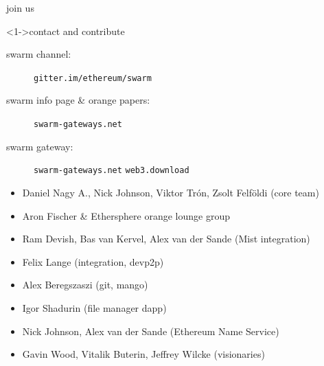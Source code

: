 \documentclass{beamer}
\begin{document}
\begin{frame}[plain]{join us}

\begin{block}<1->{contact and contribute}

\begin{description}
\item[swarm channel:] \texttt{gitter.im/ethereum/swarm}
\item[swarm info page \& orange papers:] \texttt{swarm-gateways.net}
\item[swarm gateway:] \texttt{swarm-gateways.net} \texttt{web3.download}
\end{description}
\end{block}
\begin{block}{}
\begin{itemize}
\footnotesize
\item Daniel Nagy A., Nick Johnson, Viktor Trón, Zsolt Felföldi (core team)
\item Aron Fischer \& Ethersphere orange lounge group
\item Ram Devish, Bas van Kervel, Alex van der Sande (Mist integration)
\item Felix Lange (integration, devp2p)
\item Alex Beregszaszi (git, mango)
\item Igor Shadurin (file manager dapp)
\item Nick Johnson, Alex van der Sande (Ethereum Name Service)
\item Gavin Wood, Vitalik Buterin, Jeffrey Wilcke (visionaries)
\end{itemize}
\end{block}

\end{frame}
\end{document}
